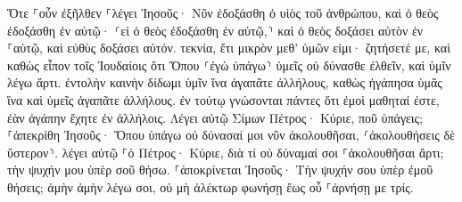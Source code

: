 \documentclass{openreader}
\begin{document}
Ὅτε ⸀οὖν ἐξῆλθεν ⸀λέγει Ἰησοῦς· Νῦν ἐδοξάσθη ὁ υἱὸς τοῦ ἀνθρώπου, καὶ ὁ θεὸς ἐδοξάσθη ἐν αὐτῷ· 
⸂εἰ ὁ θεὸς ἐδοξάσθη ἐν αὐτῷ,⸃ καὶ ὁ θεὸς δοξάσει αὐτὸν ἐν ⸀αὑτῷ, καὶ εὐθὺς δοξάσει αὐτόν. 
τεκνία, ἔτι μικρὸν μεθ’ ὑμῶν εἰμι· ζητήσετέ με, καὶ καθὼς εἶπον τοῖς Ἰουδαίοις ὅτι Ὅπου ⸂ἐγὼ ὑπάγω⸃ ὑμεῖς οὐ δύνασθε ἐλθεῖν, καὶ ὑμῖν λέγω ἄρτι. 
ἐντολὴν καινὴν δίδωμι ὑμῖν ἵνα ἀγαπᾶτε ἀλλήλους, καθὼς ἠγάπησα ὑμᾶς ἵνα καὶ ὑμεῖς ἀγαπᾶτε ἀλλήλους. 
ἐν τούτῳ γνώσονται πάντες ὅτι ἐμοὶ μαθηταί ἐστε, ἐὰν ἀγάπην ἔχητε ἐν ἀλλήλοις. 
Λέγει αὐτῷ Σίμων Πέτρος· Κύριε, ποῦ ὑπάγεις; ⸀ἀπεκρίθη Ἰησοῦς· Ὅπου ὑπάγω οὐ δύνασαί μοι νῦν ἀκολουθῆσαι, ⸂ἀκολουθήσεις δὲ ὕστερον⸃. 
λέγει αὐτῷ ⸀ὁ Πέτρος· Κύριε, διὰ τί οὐ δύναμαί σοι ⸀ἀκολουθῆσαι ἄρτι; τὴν ψυχήν μου ὑπὲρ σοῦ θήσω. 
⸀ἀποκρίνεται Ἰησοῦς· Τὴν ψυχήν σου ὑπὲρ ἐμοῦ θήσεις; ἀμὴν ἀμὴν λέγω σοι, οὐ μὴ ἀλέκτωρ φωνήσῃ ἕως οὗ ⸀ἀρνήσῃ με τρίς. 
\end{document}
